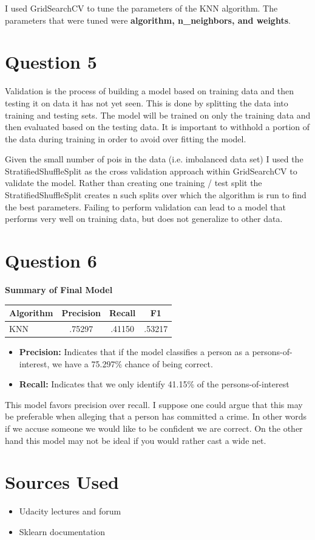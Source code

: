 \documentclass[a4paper,11pt]{report}
\begin{document}
I used GridSearchCV to tune the parameters of the KNN algorithm.  The parameters
that were tuned were \textbf{algorithm, n\_neighbors, and weights}.
  
\section{Question 5}
Validation is the process of building a model based on training data and then
testing it on data it has not yet seen. This is done by splitting the
data into training and testing sets.  The model will be trained on only the
training data and then evaluated based on the testing data.  It is important
to withhold a portion of the data during training in order to avoid over fitting
the model.

Given the small number of pois in the data (i.e. imbalanced data set) I used the
StratifiedShuffleSplit as the cross validation approach within GridSearchCV to
validate the model.  Rather than creating one training / test split the
StratifiedShuffleSplit creates n such splits over which the algorithm is run to
find the best parameters.  Failing to perform validation can lead to a model
that performs very well on training data, but does not generalize to other
data.

\section{Question 6}

\textbf{Summary of Final Model} \\
\begin{center}
    \begin{tabular}{|| l c c c ||}
        \hline Algorithm & Precision & Recall & F1 \\
        \hline\hline
        KNN & .75297 & .41150 & .53217  \\
        \hline
    \end{tabular}
\end{center}

\begin{itemize}
    \item \textbf{Precision:} Indicates that if the model classifies a person as
        a persons-of-interest, we have a 75.297\% chance of being correct.
    \item \textbf{Recall:} Indicates that we only identify 41.15\% of the
        persons-of-interest
\end{itemize}

This model favors precision over recall.  I suppose one could argue that this
may be preferable when alleging that a person has committed a crime.  In other
words if we accuse someone we would like to be confident we are correct.  On the
other hand this model may not be ideal if you would rather cast a wide net.

\section{Sources Used}
  \begin{itemize}
    \item Udacity lectures and forum
    \item Sklearn documentation
  \end{itemize}
\end{document}
